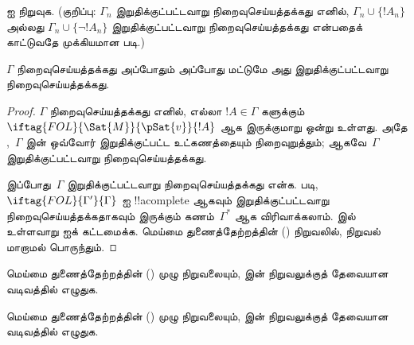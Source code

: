 \documentclass[../../../include/open-logic-section]{subfiles}
\begin{document}
\begin{prob}
 ஐ நிறுவுக. (குறிப்பு:
$\Gamma_n$ இறுதிக்குட்பட்டவாறு நிறைவுசெய்யத்தக்கது எனில்,
$\Gamma_n \cup \{!A_n\}$ அல்லது $\Gamma_n \cup \{\lnot !A_n\}$
இறுதிக்குட்பட்டவாறு நிறைவுசெய்யத்தக்கது என்பதைக் காட்டுவதே முக்கியமான படி.)
\end{prob}
\tagendprob

\begin{thm}[இறுதிக்குட்பட்ட தன்மை]
 $\Gamma$ நிறைவுசெய்யத்தக்கது அப்போதும்
அப்போது மட்டுமே அது இறுதிக்குட்பட்டவாறு நிறைவுசெய்யத்தக்கது.
\end{thm}

\begin{proof}
$\Gamma$ நிறைவுசெய்யத்தக்கது எனில், எல்லா $!A \in \Gamma$ களுக்கும்
$\iftag{FOL}{\Sat{M}}{\pSat{v}}{!A}$ ஆக இருக்குமாறு
ஒன்று உள்ளது. அதே ,~$\Gamma$ இன்
ஒவ்வோர் இறுதிக்குட்பட்ட உட்கணத்தையும் நிறைவுறுத்தும்; ஆகவே~$\Gamma$
இறுதிக்குட்பட்டவாறு நிறைவுசெய்யத்தக்கது.

இப்போது~$\Gamma$ இறுதிக்குட்பட்டவாறு நிறைவுசெய்யத்தக்கது என்க.
 படி, $\iftag{FOL}{\Gamma'}{\Gamma}$ ஐ
!!a{complete} ஆகவும் இறுதிக்குட்பட்டவாறு நிறைவுசெய்யத்தக்கதாகவும் இருக்கும்
கணம்~$\Gamma^*$ ஆக விரிவாக்கலாம்.  இல் உள்ளவாறு
ஐக் கட்டமைக்க.
மெய்மை துணைத்தேற்றத்தின் () நிறுவலில்,
 நிறுவல் மாறாமல் பொருந்தும்.
\end{proof}

\begin{prob}
மெய்மை துணைத்தேற்றத்தின் () முழு நிறுவலையும்,
 இன் நிறுவலுக்குத் தேவையான
வடிவத்தில் எழுதுக.
\end{prob}
\tagendprob

\begin{prob}
மெய்மை துணைத்தேற்றத்தின் () முழு நிறுவலையும்,
 இன் நிறுவலுக்குத் தேவையான
வடிவத்தில் எழுதுக.
\end{prob}
\tagendprob
\end{document}
